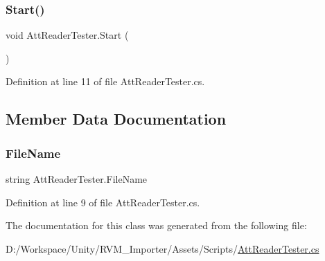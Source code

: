 \subsubsection{\texorpdfstring{Start()}{Start()}}
{\footnotesize\ttfamily void Att\+Reader\+Tester.\+Start (\begin{DoxyParamCaption}{ }\end{DoxyParamCaption})}



Definition at line 11 of file Att\+Reader\+Tester.\+cs.



\subsection{Member Data Documentation}
\mbox{\label{class_att_reader_tester_af5a4b71fdccabe095f1715251960a13f}} 
\subsubsection{\texorpdfstring{FileName}{FileName}}
{\footnotesize\ttfamily string Att\+Reader\+Tester.\+File\+Name}



Definition at line 9 of file Att\+Reader\+Tester.\+cs.



The documentation for this class was generated from the following file\+:\begin{DoxyCompactItemize}
\item 
D\+:/\+Workspace/\+Unity/\+R\+V\+M\+\_\+\+Importer/\+Assets/\+Scripts/\mbox{\hyperlink{_att_reader_tester_8cs}{Att\+Reader\+Tester.\+cs}}\end{DoxyCompactItemize}
